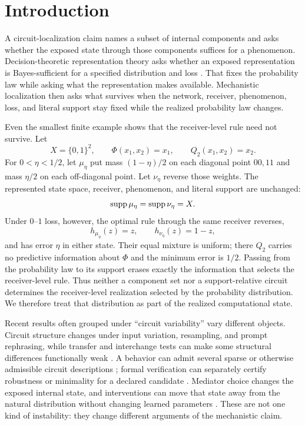 \section{Introduction}
\label{sec:introduction}

A circuit-localization claim names a subset of internal components and asks whether the exposed state through those components suffices for a phenomenon. Decision-theoretic representation theory asks whether an exposed representation is Bayes-sufficient for a specified distribution and loss \citep{sevetlidis2026bayes}. That fixes the probability law while asking what the representation makes available. Mechanistic localization then asks what survives when the network, receiver, phenomenon, loss, and literal support stay fixed while the realized probability law changes.

Even the smallest finite example shows that the receiver-level rule need not survive. Let
\[
X=\{0,1\}^2,\qquad
\Phi(x_1,x_2)=x_1,\qquad
Q_2(x_1,x_2)=x_2.
\]
For $0<\eta<1/2$, let $\mu_\eta$ put mass $(1-\eta)/2$ on each diagonal point $00,11$ and mass $\eta/2$ on each off-diagonal point. Let $\nu_\eta$ reverse those weights. The represented state space, receiver, phenomenon, and literal support are unchanged:
\[
\operatorname{supp}\mu_\eta=\operatorname{supp}\nu_\eta=X.
\]
Under $0$--$1$ loss, however, the optimal rule through the same receiver reverses,
\[
h_{\mu_\eta}(z)=z,\qquad h_{\nu_\eta}(z)=1-z,
\]
and has error $\eta$ in either state. Their equal mixture is uniform; there $Q_2$ carries no predictive information about $\Phi$ and the minimum error is $1/2$. Passing from the probability law to its support erases exactly the information that selects the receiver-level rule. Thus neither a component set nor a support-relative circuit determines the receiver-level realization selected by the probability distribution. We therefore treat that distribution as part of the realized computational state.

Recent results often grouped under ``circuit variability'' vary different objects. Circuit structure changes under input variation, resampling, and prompt rephrasing, while transfer and interchange tests can make some structural differences functionally weak \citep{bayat2026many,wu2026variance}. A behavior can admit several sparse or otherwise admissible circuit descriptions \citep{chen2026allcircuits,meloux2025identifiable}; formal verification can separately certify robustness or minimality for a declared candidate \citep{hadad2026formal}. Mediator choice changes the exposed internal state, and interventions can move that state away from the natural distribution without changing learned parameters \citep{mueller2026mediator,grant2026divergent}. These are not one kind of instability: they change different arguments of the mechanistic claim.

